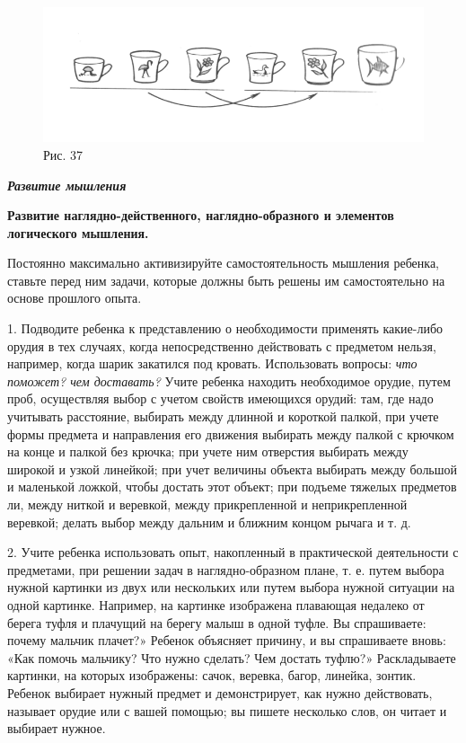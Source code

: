 \documentclass{book}
\renewcommand{\emph}[1]{\textit{#1}}
\begin{document}
\begin{figure}
\centering
\includegraphics[width=\linewidth]{media/media/image34.png}
\caption*{Рис. 37}
\end{figure}


\emph{\textbf{Развитие мышления}}

\textbf{Развитие наглядно-действенного, наглядно-образного и элементов
логического мышления.}

Постоянно максимально активизируйте самостоятельность мышления ребенка,
ставьте перед ним задачи, которые должны быть решены им самостоятельно
на основе прошлого опыта.

1. Подводите ребенка к представлению о необходимости применять
какие-либо орудия в тех случаях, когда непосредственно действовать с
предметом нельзя, например, когда шарик закатился под кровать.
Использовать вопросы: \emph{что поможет? чем доставать?} Учите ребенка
находить необходимое орудие, путем проб, осуществляя выбор с учетом
свойств имеющихся орудий: там, где надо учитывать расстояние, выбирать
между длинной и короткой палкой, при учете формы предмета и направления
его движения выбирать между палкой с крючком на конце и палкой без
крючка; при учете ним отверстия выбирать между широкой и узкой линейкой;
при учет величины объекта выбирать между большой и маленькой ложкой,
чтобы достать этот объект; при подъеме тяжелых предметов ли, между
ниткой и веревкой, между прикрепленной и неприкрепленной веревкой;
делать выбор между дальним и ближним концом рычага и т. д.

2. Учите ребенка использовать опыт, накопленный в практической
деятельности с предметами, при решении задач в наглядно-образном плане,
т. е. путем выбора нужной картинки из двух или нескольких или путем
выбора нужной ситуации на одной картинке. Например, на картинке
изображена плавающая недалеко от берега туфля и плачущий на берегу малыш
в одной туфле. Вы спрашиваете: почему мальчик плачет?» Ребенок объясняет
причину, и вы спрашиваете вновь: «Как помочь мальчику? Что нужно
сделать? Чем достать туфлю?» Раскладываете картинки, на которых
изображены: сачок, веревка, багор, линейка, зонтик. Ребенок выбирает
нужный предмет и демонстрирует, как нужно действовать, называет орудие
или с вашей помощью; вы пишете несколько слов, он читает и выбирает
нужное.
\end{document}

